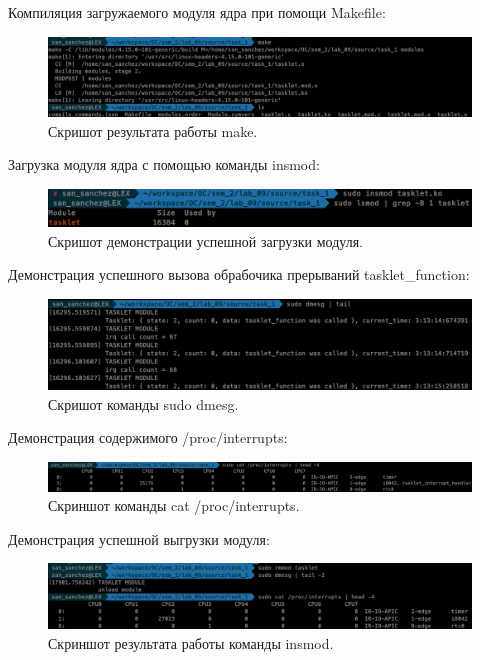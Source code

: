 Компиляция загружаемого модуля ядра при помощи Makefile:
\begin{figure}[H]
    \centering
    \includegraphics[scale=0.3]{data/image/make_tasklet.png}
    \caption{Скришот результата работы make.}
\end{figure}

Загрузка модуля ядра с помощью команды insmod:
\begin{figure}[H]
    \centering
    \includegraphics[scale=0.4]{data/image/ismod.png}
    \caption{Скришот демонстрации успешной загрузки модуля.}
\end{figure}


Демонстрация успешного вызова обрабочика прерываний tasklet\_function:
\begin{figure}[H]
    \centering
    \includegraphics[scale=0.37]{data/image/irps_key.png}
    \caption{Скришот команды sudo dmesg.}
\end{figure}

Демонстрация содержимого /proc/interrupts:
\begin{figure}[H]
    \centering
    \includegraphics[scale=0.29]{data/image/cat.png}
    \caption{Скриншот команды cat /proc/interrupts.}
\end{figure}

Демонстрация успешной выгрузки модуля:
\begin{figure}[H]
    \centering
    \includegraphics[scale=0.35]{data/image/rmmod.png}
    \caption{Скриншот результата работы команды insmod.}
\end{figure}

